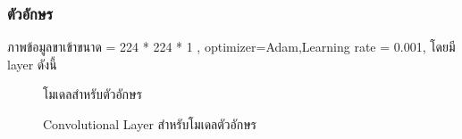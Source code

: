 \documentclass[12pt,oneside,openright,a4paper]{cpe-thai-project}
\begin{document}
\subsubsection{ตัวอักษร}
ภาพข้อมูลขาเข้าขนาด = 224 * 224 * 1 , 
optimizer=Adam,Learning rate = 0.001, โดยมี layer ดังนี้
\begin{figure}[!ht]\centering
  \setlength{\fboxrule}{0.2mm} %
  \setlength{\fboxsep}{1cm}
  \caption{โมเดลสำหรับตัวอักษร}\label{fig:modelarchitecture}
 \end{figure}
 \begin{figure}[!ht]\centering
  \setlength{\fboxrule}{0.2mm} %
  \setlength{\fboxsep}{1cm}
  \caption{Convolutional Layer สำหรับโมเดลตัวอักษร}\label{fig:convolutionallayer}
 \end{figure}
\newpage
\end{document}
